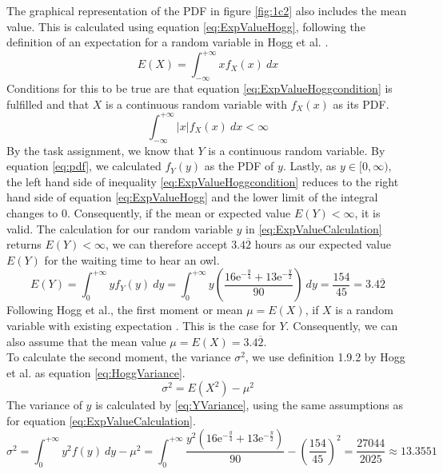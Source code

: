 The graphical representation of the PDF in figure \eqref{fig:1c2} also includes the mean value. This is calculated using equation \eqref{eq:ExpValueHogg}, following the definition of an expectation for a random variable in Hogg et al. \cite[Definition~1.8.1]{hogg}.
\begin{equation}
E(X) = \int^{+\infty}_{-\infty} x f_X(x) ~ dx
\label{eq:ExpValueHogg}
\end{equation}
Conditions for this to be true are that equation \eqref{eq:ExpValueHoggcondition} is fulfilled and that $X$ is a continuous random variable with $f_X(x)$ as its PDF.
\begin{equation}
\int^{+\infty}_{-\infty} |x| f_X(x) ~ dx < \infty
\label{eq:ExpValueHoggcondition}
\end{equation}
By the task assignment, we know that $Y$ is a continuous random variable. By equation \eqref{eq:pdf}, we calculated $f_Y(y)$ as the PDF of $y$. Lastly, as $y \in [0,\infty)$, the left hand side of inequality \eqref{eq:ExpValueHoggcondition} reduces to the right hand side of equation \eqref{eq:ExpValueHogg} and the lower limit of the integral changes to 0. Consequently, if the mean or expected value $E(Y) < \infty$, it is valid. The calculation for our random variable $y$ in \eqref{eq:ExpValueCalculation} returns $E(Y) < \infty$, we can therefore accept $3.4\overline{2}$ hours as our expected value $E(Y)$ for the waiting time to hear an owl. 
%
\begin{equation}
E(Y) = \int^{+\infty}_{0} y f_Y(y) ~ dy = \int^{+\infty}_{0} y\left(\dfrac{16\mathrm{e}^{-\frac{y}{4}}+13\mathrm{e}^{-\frac{y}{2}}}{90} \right) ~dy = \frac{154}{45} = 3.4\overline{2}
\label{eq:ExpValueCalculation}
\end{equation}
Following Hogg et al., the first moment or mean $\mu = E(X)$, if $X$ is a random variable with existing expectation \cite[Definition~1.9.1]{hogg}. This is the case for $Y$. Consequently, we can also assume that the mean value $\mu = E(X) = 3.4\overline{2}$. 
\\
To calculate the second moment, the variance $\sigma^2$, we use definition 1.9.2 by Hogg et al. \cite{hogg} as equation \eqref{eq:HoggVariance}.
\begin{equation}
\sigma^2 = E(X^2) - \mu^2
\label{eq:HoggVariance}
\end{equation}
%
The variance of $y$ is calculated by \eqref{eq:YVariance}, using the same assumptions as for equation \eqref{eq:ExpValueCalculation}.
\begin{equation}
\sigma^2 = \int^{+\infty}_{0} y^2 f(y) ~ dy - \mu^2
= \int^{+\infty}_{0} \dfrac{y^2\left(16\mathrm{e}^{-\frac{y}{4}}+13\mathrm{e}^{-\frac{y}{2}}\right)}{90} - \left(\frac{154}{45}\right)^2
= \frac{27044}{2025} \approx 13.3551
\label{eq:YVariance}
\end{equation}

